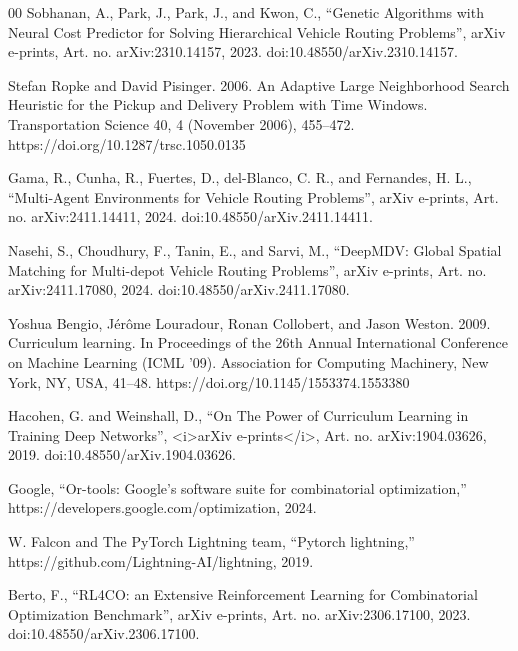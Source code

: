 \documentclass[journal,twoside,web]{ieeecolor}
\theoremstyle{definition}
\theoremstyle{remark}
\theoremstyle{definition}
\begin{document}
\begin{thebibliography}{00}
Sobhanan, A., Park, J., Park, J., and Kwon, C., “Genetic Algorithms with Neural Cost Predictor for Solving Hierarchical Vehicle Routing Problems”, arXiv e-prints, Art. no. arXiv:2310.14157, 2023. doi:10.48550/arXiv.2310.14157.

Stefan Ropke and David Pisinger. 2006. An Adaptive Large Neighborhood Search Heuristic for the Pickup and Delivery Problem with Time Windows. Transportation Science 40, 4 (November 2006), 455–472. https://doi.org/10.1287/trsc.1050.0135

Gama, R., Cunha, R., Fuertes, D., del-Blanco, C. R., and Fernandes, H. L., “Multi-Agent Environments for Vehicle Routing Problems”, arXiv e-prints, Art. no. arXiv:2411.14411, 2024. doi:10.48550/arXiv.2411.14411.

Nasehi, S., Choudhury, F., Tanin, E., and Sarvi, M., “DeepMDV: Global Spatial Matching for Multi-depot Vehicle Routing Problems”, arXiv e-prints, Art. no. arXiv:2411.17080, 2024. doi:10.48550/arXiv.2411.17080.

Yoshua Bengio, Jérôme Louradour, Ronan Collobert, and Jason Weston. 2009. Curriculum learning. In Proceedings of the 26th Annual International Conference on Machine Learning (ICML '09). Association for Computing Machinery, New York, NY, USA, 41–48. https://doi.org/10.1145/1553374.1553380

Hacohen, G. and Weinshall, D., “On The Power of Curriculum Learning in Training Deep Networks”, <i>arXiv e-prints</i>, Art. no. arXiv:1904.03626, 2019. doi:10.48550/arXiv.1904.03626.

Google, “Or-tools: Google’s software suite for combinatorial optimization,” https://developers.google.com/optimization, 2024.

W. Falcon and The PyTorch Lightning team, “Pytorch lightning,” https://github.com/Lightning-AI/lightning, 2019.

Berto, F., “RL4CO: an Extensive Reinforcement Learning for Combinatorial Optimization Benchmark”, arXiv e-prints, Art. no. arXiv:2306.17100, 2023. doi:10.48550/arXiv.2306.17100.
\end{thebibliography}
\end{document}

